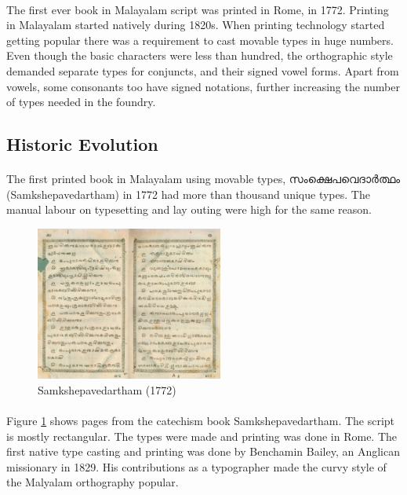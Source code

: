 \documentclass[10pt]{article}
\begin{document}
\paragraph{}
The first ever book in Malayalam script was printed in Rome, in 1772. Printing in Malayalam started natively during 1820s\cite{babucherian}. When printing technology started getting popular there was a requirement to cast movable types in huge numbers. Even though the basic characters were less than hundred, the orthographic style demanded separate types for conjuncts, and their signed vowel forms. Apart from vowels, some consonants too have signed notations, further increasing the number of types needed in the foundry. 

\subsection{Historic Evolution}

\paragraph{}
The first printed book in Malayalam using movable types, {\manjari സംക്ഷെപവെദാർത്ഥം} (Samkshepavedartham) in 1772 had more than thousand unique types\cite{babucherian}. The manual labour on typesetting and lay outing were high for the same reason. 

\begin{figure}
 \centering
  \includegraphics[width=0.55\textwidth]{images/samkshepavedartham1772.png}
   \caption{Samkshepavedartham (1772)}
	\label{Samkshepam}
\end{figure}

\paragraph{}
Figure \ref{Samkshepam} shows pages from the catechism book Samkshepavedartham. The script is mostly rectangular. The types were made and printing was done in Rome. The first native type casting and printing was done by Benchamin Bailey, an Anglican missionary in 1829.  His contributions as a typographer made the curvy style of the Malyalam orthography popular\cite{gupthannair}.
\end{document}
